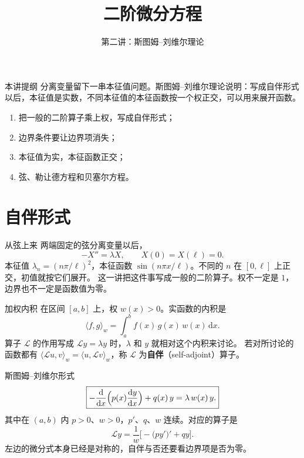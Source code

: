 \documentclass[fontset=windows, chinese, 10pt, xcolor=dvipsnames]{beamer}
\title{二阶微分方程}
\subtitle{第二讲：斯图姆--刘维尔理论}
\begin{document}
\begin{frame}
  \titlepage
\end{frame}

\begin{frame}{本讲提纲}
  分离变量留下一串本征值问题。斯图姆--刘维尔理论说明：写成自伴形式以后，本征值是实数，不同本征值的本征函数按一个权正交，可以用来展开函数。
  \begin{enumerate}
    \item 把一般的二阶算子乘上权，写成自伴形式；
    \item 边界条件要让边界项消失；
    \item 本征值为实，本征函数正交；
    \item 弦、勒让德方程和贝塞尔方程。
  \end{enumerate}
\end{frame}

\section{自伴形式}

\begin{frame}{从弦上来}
  两端固定的弦分离变量以后，
  \[
    -X''=\lambda X,\qquad X(0)=X(\ell)=0.
  \]
  本征值 $\lambda_n=(n\pi/\ell)^2$，本征函数 $\sin(n\pi x/\ell)$。不同的 $n$ 在 $[0,\ell]$ 上正交，初值就按它们展开。
  \vspace{0.35em}
  这一讲把这件事写成一般的二阶算子。权不一定是 $1$，边界也不一定是函数值为零。
\end{frame}

\begin{frame}{加权内积}
  在区间 $[a,b]$ 上，权 $w(x)>0$。实函数的内积是
  \begin{equation*}
    \langle f,g\rangle_w
    =\int_a^b f(x)\,g(x)\,w(x)\,\mathrm{d}x.
  \end{equation*}
  算子 $\mathcal{L}$ 的作用写成 $\mathcal{L}y=\lambda y$ 时，$\lambda$ 和 $y$ 就相对这个内积来讨论。
  \vspace{0.3em}
  若对所讨论的函数都有 $\langle\mathcal{L}u,v\rangle_w=\langle u,\mathcal{L}v\rangle_w$，称 $\mathcal{L}$ 为\textbf{自伴}（self-adjoint）算子。
\end{frame}

\begin{frame}{斯图姆--刘维尔形式}
  \begin{equation*}
    \boxed{\displaystyle
      -\frac{\mathrm{d}}{\mathrm{d}x}\Bigl(p(x)\frac{\mathrm{d}y}{\mathrm{d}x}\Bigr)
      +q(x)\,y
      =\lambda\,w(x)\,y.}
  \end{equation*}
  其中在 $(a,b)$ 内 $p>0$、$w>0$，$p'$、$q$、$w$ 连续。对应的算子是
  \[
    \mathcal{L}y
    =\frac{1}{w}\Biggl[
      -\bigl(p y'\bigr)'+q y
    \Biggr].
  \]
  左边的微分式本身已经是对称的，自伴与否还要看边界项是否为零。
\end{frame}
\end{document}
